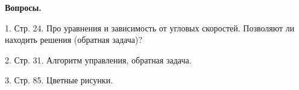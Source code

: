 \textbf{Вопросы.}

1. Стр. 24. Про уравнения и зависимость от угловых скоростей. Позволяют ли находить решения (обратная задача)?

2. Стр. 31. Алгоритм управления, обратная задача.

3. Стр. 85. Цветные рисунки.

\clearpage

\tableofcontents*
{}
\endTOCtrue
{}